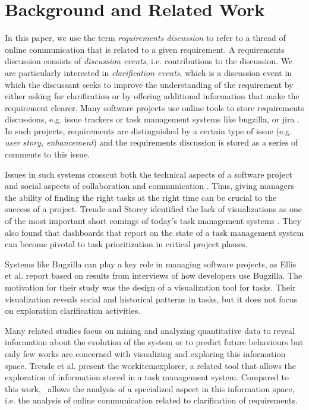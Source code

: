 \section{Background and Related Work}
In this paper, we use the term \emph{requirements discussion} to refer to a thread of online communication that is related to a given requirement. 
A requirements discussion consists of \emph{discussion events}, i.e. contributions to the discussion.
We are particularly interested in \emph{clarification events}, which is a discussion event in which the discussant seeks to improve the understanding of the requirement by either asking for clarification or by offering additional information that make the requirement clearer.
Many software projects use online tools to store requirements discussions, e.g. issue trackers or task management systems like bugzilla, or jira \cite{Ernst2012}. 
In such projects, requirements are distinguished by a certain type of issue (e.g. \emph{user story, enhancement}) and the requirements discussion is stored as a series of comments to this issue.

Issues in such systems crosscut both the technical aspects of a software project and social aspects of collaboration and communication \cite{Kraut1995}. 
Thus, giving managers the ability of finding the right tasks at the right time can be crucial to the success of a project.
Treude and Storey identified the lack of visualizations as one of the most important short comings of today's task management systems \cite{Treude2010}. They also found that dashboards that report on the state of a task management system can become pivotal to task prioritization in critical project phases.

Systems like Bugzilla can play a key role in managing software projects, as Ellis et al. \cite{Ellis2007} report based on results from interviews of how developers use Bugzilla. 
The motivation for their study was the design of a visualization tool for tasks. 
Their visualization reveals social and historical patterns in tasks, but it does not focus on exploration clarification activities.

Many related studies focus on mining and analyzing quantitative data to reveal information about the evolution of the system or to predict future behaviours but only few works are concerned with visualizing and exploring this information space. 
Treude et al. \cite{Treude2012} present the workitemexplorer, a related tool that allows the exploration of information stored in a task management system.
Compared to this work, \viss\ allows the analysis of a specialized aspect in this information space, i.e. the analysis of online communication related to clarification of requirements. 